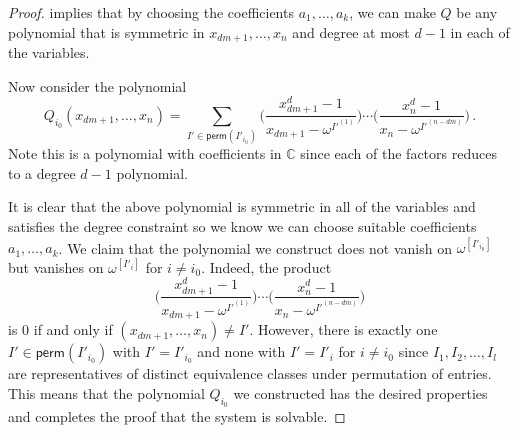 \documentclass{toc}
\renewcommand\C{{\mathbb{C}}}
\newcommand\perm{\textsf{perm}}
\begin{document}
\begin{proof}
 implies that by choosing the coefficients $a_1, \dots , a_k$, we can make $Q$ be any polynomial that is symmetric in $x_{dm+1} ,\dots ,x_n$ and degree at most $d-1$ in each of the variables.  


Now consider the polynomial 
\[
Q_{i_0}(x_{dm+1}, \dots , x_n) = \sum_{I' \in \perm(I'_{i_0})} \bigg( \frac{x_{dm+1}^d-1}{x_{dm+1}-\omega^{I'^{(1)}}} \bigg) \cdots \bigg( \frac{x_n^d-1}{x_n-\omega^{I'^{(n-dm)}}} \bigg) \,.
\]
Note this is a polynomial with coefficients in $\C$ since each of the factors reduces to a degree $d-1$ polynomial.

It is clear that the above polynomial is symmetric in all of the variables and satisfies the degree constraint so we know we can choose suitable coefficients $a_1, \dots  , a_k$.  We claim that the polynomial we construct does not vanish on $\omega^{[I'_{i_0}]}$ but vanishes on $\omega^{[I'_{i}]}$ for $i \neq i_0$.  Indeed, the product
\[
\bigg( \frac{x_{dm+1}^d-1}{x_{dm+1}-\omega^{I'^{(1)}}} \bigg) \cdots \bigg( \frac{x_n^d-1}{x_n-\omega^{I'^{(n-dm)}}} \bigg)
\]
is $0$ if and only if $(x_{dm+1}, \dots , x_{n}) \neq I'$.  However, there is exactly one $I' \in \perm(I'_{i_0})$ with $I' = I'_{i_0}$ and none with $I' = I'_{i}$ for $i \neq i_0$ since $I_1, I_2, \dots , I_l$ are representatives of distinct equivalence classes under permutation of entries.  This means that the polynomial $Q_{i_0}$ we constructed has the desired properties and completes the proof that the system is solvable.
\end{proof}
\end{document}
